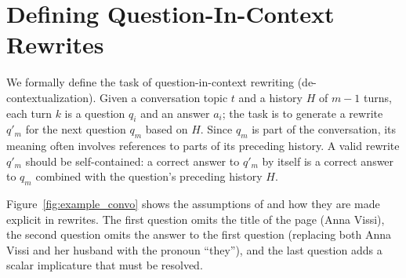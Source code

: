 \section{Defining Question-In-Context Rewrites  \label{sec:pp_task}}



%
We formally define the task of question-in-context rewriting
(de-contextualization).
%
Given a conversation topic $t$ and a history $H$ of $m-1$ turns, 
each turn $k$ is a question $q_i$ and an answer $a_i$;
the task is to generate a rewrite $q'_m$ for the next question $q_m$
based on $H$.
%
Since $q_m$ is part of the conversation, its meaning often involves
references to parts of its preceding history.
%
A valid rewrite $q'_m$ should be self-contained: a correct answer
to $q'_m$ by itself is a correct answer to $q_m$ combined with the
question's preceding history $H$.

Figure~\ref{fig:example_convo} shows the assumptions of  and
how they are made explicit in rewrites.
%
The first question omits the title of the page (Anna Vissi), the
second question omits the answer to the first question (replacing both
Anna Vissi and her husband with the pronoun ``they''), and the last
question adds a scalar implicature that must be resolved.



